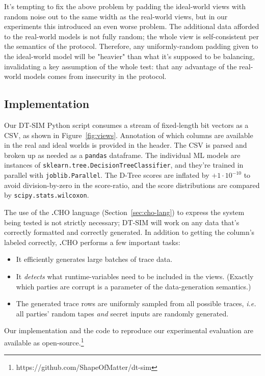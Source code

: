 \documentclass[acmlarge, manuscript, screen, review, anonymous, table]{acmart}
\newif\ifanonymous
\newcommand{\github}{\ifanonymous redacted for anonymous submission\else https://github.com/ShapeOfMatter/dt-sim\fi}
\newcommand{\ie}{\textit{i.e.}\xspace}
\newcommand{\langname}{\textsc{\textbf{.}CHO}\xspace}
\newcommand{\toolname}{\textsc{DT-SIM}\xspace}
\begin{document}
It's tempting to fix the above problem by padding the ideal-world views with random noise out to the same width as the real-world views,
but in our experiments this introduced an even worse problem.
The additional data afforded to the real-world models is not fully random;
the whole view is self-consistent per the semantics of the protocol.
Therefore, any uniformly-random padding given to the ideal-world model will be "heavier" than what it's supposed to be balancing,
invalidating a key assumption of the whole test:
that any advantage of the real-world models comes from insecurity in the protocol.

\subsection{Implementation}

Our \toolname Python script consumes a stream of fixed-length bit vectors as a CSV,
as shown in Figure~\ref{fig:views}.
Annotation of which columns are available in the real and ideal worlds is provided in the header.
The CSV is parsed and broken up as needed as a \texttt{pandas} dataframe.
The individual ML models are instances of \texttt{sklearn.tree.DecisionTreeClassifier},
and they're trained in parallel with \texttt{joblib.Parallel}.
The D-Tree scores are inflated by $+1 \cdot 10^{-10}$ to avoid division-by-zero in the score-ratio,
and the score distributions are compared by \texttt{scipy.stats.wilcoxon}.

The use of the \langname language (Section~\ref{sec:cho-lang}) to express the system being tested is not strictly necessary;
\toolname will work on any data that's correctly formatted and correctly generated.
In addition to getting the column's labeled correctly, \langname performs a few important tasks:
\begin{itemize}
    \item It efficiently generates large batches of trace data.
    \item It \emph{detects} what runtime-variables need to be included in the views.
        (Exactly which parties are corrupt is a parameter of the data-generation semantics.)
    \item The generated trace rows are uniformly sampled from all possible traces,
        \ie all parties' random tapes \emph{and} secret inputs are randomly generated.
\end{itemize}
Our implementation and the code to reproduce our experimental evaluation are available as open-source.\footnote{\github}
\end{document}

